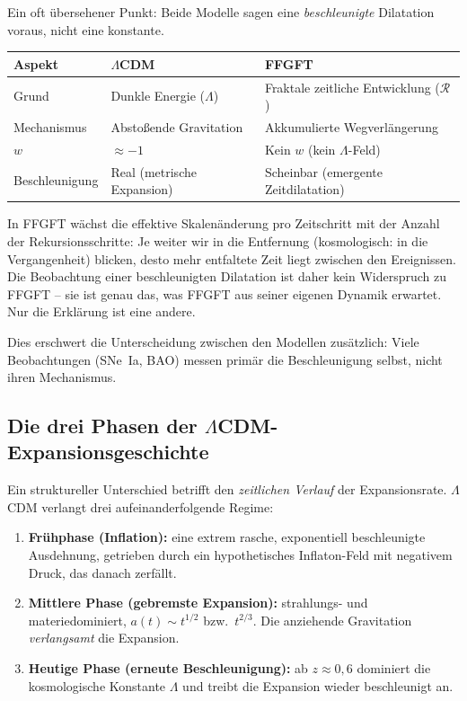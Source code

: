 Ein oft übersehener Punkt: Beide Modelle sagen eine \emph{beschleunigte}
Dilatation voraus, nicht eine konstante.

\begin{center}
\begin{tabular}{p{3cm}p{5cm}p{5cm}}
\toprule
\textbf{Aspekt} & \textbf{$\Lambda$CDM} & \textbf{FFGFT} \\
\midrule
Grund & Dunkle Energie ($\Lambda$) & Fraktale zeitliche Entwicklung ($\mathcal{R}$) \\
Mechanismus & Abstoßende Gravitation & Akkumulierte Wegverlängerung \\
$w$ & $\approx -1$ & Kein $w$ (kein $\Lambda$-Feld) \\
Beschleunigung & Real (metrische Expansion) & Scheinbar (emergente Zeitdilatation) \\
\bottomrule
\end{tabular}
\end{center}

In FFGFT wächst die effektive Skalenänderung pro Zeitschritt mit der Anzahl
der Rekursionsschritte: Je weiter wir in die Entfernung (kosmologisch: in
die Vergangenheit) blicken, desto mehr entfaltete Zeit liegt zwischen den
Ereignissen. Die Beobachtung einer beschleunigten Dilatation ist daher kein
Widerspruch zu FFGFT -- sie ist genau das, was FFGFT aus seiner eigenen
Dynamik erwartet. Nur die Erklärung ist eine andere.

Dies erschwert die Unterscheidung zwischen den Modellen zusätzlich: Viele
Beobachtungen (SNe~Ia, BAO) messen primär die Beschleunigung selbst, nicht
ihren Mechanismus.

\subsection*{Die drei Phasen der $\Lambda$CDM-Expansionsgeschichte}

Ein struktureller Unterschied betrifft den \emph{zeitlichen Verlauf} der
Expansionsrate. $\Lambda$CDM verlangt drei aufeinanderfolgende Regime:

\begin{enumerate}
  \item \textbf{Frühphase (Inflation):} eine extrem rasche, exponentiell
        beschleunigte Ausdehnung, getrieben durch ein hypothetisches
        Inflaton-Feld mit negativem Druck, das danach zerfällt.
  \item \textbf{Mittlere Phase (gebremste Expansion):} strahlungs- und
        materiedominiert, $a(t) \sim t^{1/2}$ bzw.\ $t^{2/3}$. Die
        anziehende Gravitation \emph{verlangsamt} die Expansion.
  \item \textbf{Heutige Phase (erneute Beschleunigung):} ab $z \approx 0{,}6$
        dominiert die kosmologische Konstante $\Lambda$ und treibt die
        Expansion wieder beschleunigt an.
\end{enumerate}

